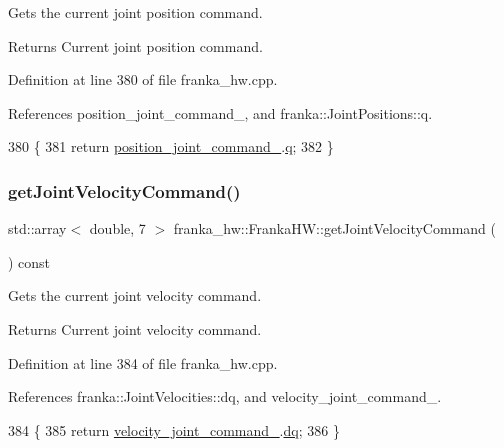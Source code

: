 Gets the current joint position command.

\begin{DoxyReturn}{Returns}
Current joint position command. 
\end{DoxyReturn}


Definition at line 380 of file franka\+\_\+hw.\+cpp.



References position\+\_\+joint\+\_\+command\+\_\+, and franka\+::\+Joint\+Positions\+::q.


\begin{DoxyCode}
380                                                                      \{
381   \textcolor{keywordflow}{return} \hyperlink{classfranka__hw_1_1FrankaHW_a21bc8c749210aa50ac5a847065d01042}{position\_joint\_command\_}.\hyperlink{classfranka_1_1JointPositions_a40e9098abe1c51cd48e17e41fbf78337}{q};
382 \}
\end{DoxyCode}
\mbox{\label{classfranka__hw_1_1FrankaHW_a93067ec2c8ba530188ee70f024ddf100}} 
\subsubsection{\texorpdfstring{get\+Joint\+Velocity\+Command()}{getJointVelocityCommand()}}
{\footnotesize\ttfamily std\+::array$<$ double, 7 $>$ franka\+\_\+hw\+::\+Franka\+H\+W\+::get\+Joint\+Velocity\+Command (\begin{DoxyParamCaption}{ }\end{DoxyParamCaption}) const\hspace{0.3cm}{\ttfamily [noexcept]}}

Gets the current joint velocity command.

\begin{DoxyReturn}{Returns}
Current joint velocity command. 
\end{DoxyReturn}


Definition at line 384 of file franka\+\_\+hw.\+cpp.



References franka\+::\+Joint\+Velocities\+::dq, and velocity\+\_\+joint\+\_\+command\+\_\+.


\begin{DoxyCode}
384                                                                      \{
385   \textcolor{keywordflow}{return} \hyperlink{classfranka__hw_1_1FrankaHW_ae25ff898759d1f0c9a34c873cadd8e01}{velocity\_joint\_command\_}.\hyperlink{classfranka_1_1JointVelocities_a14fddb6fe7a7c4034dc82c283de8c2d3}{dq};
386 \}
\end{DoxyCode}
\mbox{\label{classfranka__hw_1_1FrankaHW_ab73b14d5f8481cd3cb3d670aeae2de06}} 
